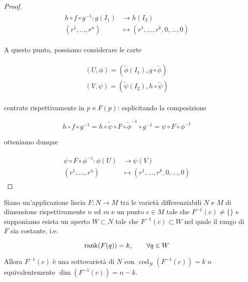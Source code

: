 \begin{proof}
	\begin{align}
		\begin{split}
			h \circ f \circ g^{-1} : g(I_{1}) &\to h(I_{2})\\
			(r^{1},\dots,r^{n}) &\mapsto (r^{1},\dots,r^{k},0,\dots,0)
		\end{split}
	\end{align}

	A questo punto, possiamo considerare le carte
	
	\begin{align}
		\begin{split}
			(U,\phi) = (\tilde{\phi}(I_{1}),g \circ \tilde{\phi})\\
			(V,\psi) = (\tilde{\psi}(I_{2}),h \circ \tilde{\psi})
		\end{split}
	\end{align}

	centrate rispettivamente in $ p $ e $ F(p) $: esplicitando la composizione
	
	\begin{equation}
		h \circ f \circ g^{-1} = h \circ \tilde{\psi} \circ F \circ \tilde{\phi}^{-1} \circ g^{-1} = \psi \circ F \circ \phi^{-1}
	\end{equation}

	otteniamo dunque
	
	\begin{align}
		\begin{split}
			\psi \circ F \circ \phi^{-1} : \phi(U) &\to \psi(V)\\
			(r^{1},\dots,r^{n}) &\mapsto (r^{1},\dots,r^{k},0,\dots,0)
		\end{split}
	\end{align}
\end{proof}

\begin{theorem}
	Siano un'applicazione liscia $ F : N \to M $ tra le varietà differenziabili $ N $ e $ M $ di dimensione rispettivamente $ n $ ed $ m $ e un punto $ c \in M $ tale che $ F^{-1}(c) \neq \{\} $ e supponiamo esista un aperto $ W \subset N $ tale che $ F^{-1}(c) \subset W $ nel quale il rango di $ F $ sia costante, i.e.
	
	\begin{equation}
		\rank(F(q))=k, \qquad \forall q \in W
	\end{equation}

	Allora $ F^{-1}(c) $ è una sottovarietà di $ N $ con $ \operatorname{cod}_{N}(F^{-1}(c)) = k $ o equivalentemente $ \dim(F^{-1}(c)) = n-k $.
\end{theorem}

